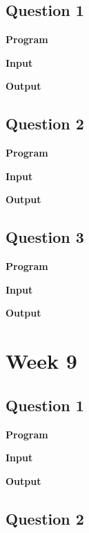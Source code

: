 \documentclass{article}
\begin{document}
\subsection{Question 1}

\newline

\noindent \textbf{\large{Program}}

\newpage
\noindent \textbf{\large{Input}}

\noindent \textbf{\large{Output}}


\newpage
\subsection{Question 2}

\newline

\noindent \textbf{\large{Program}}

\newpage
\noindent \textbf{\large{Input}}

\noindent \textbf{\large{Output}}


\newpage
\subsection{Question 3}

\newline

\noindent \textbf{\large{Program}}

\newpage
\noindent \textbf{\large{Input}}

\noindent \textbf{\large{Output}}

\newpage
\section{Week 9}

\subsection{Question 1}

\newline

\noindent \textbf{\large{Program}}

\newpage
\noindent \textbf{\large{Input}}

\noindent \textbf{\large{Output}}


\newpage
\subsection{Question 2}

\newline
\end{document}
